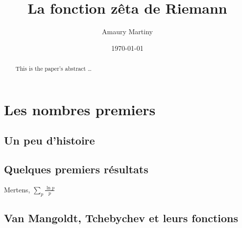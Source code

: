 \documentclass[french]{report}
\title{La fonction zêta de Riemann}
\author{Amaury Martiny}
\date{\today}
\begin{document}
\maketitle

\begin{abstract}
  This is the paper's abstract \ldots
  \end{abstract}

\tableofcontents{}

\chapter{Les nombres premiers}

\section{Un peu d'histoire}

\section{Quelques premiers résultats}

Mertens, $\sum_p\frac{\ln p}{p}$

\section{Van Mangoldt, Tchebychev et leurs fonctions}
\end{document}

